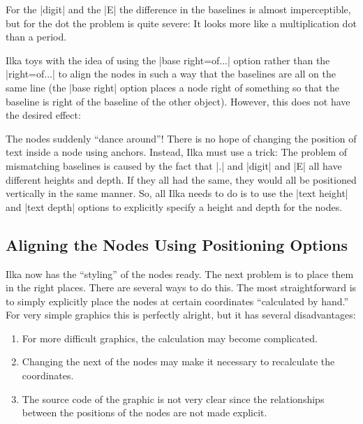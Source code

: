 For the |digit| and the |E| the difference in the baselines is almost
imperceptible, but for the dot the problem is quite severe: It looks
more like a multiplication dot than a period.

Ilka toys with the idea of using the |base right=of...| option rather than
the |right=of...| to align the nodes in such a way that the baselines
are all on the same line (the |base right| option places a node
right of something so that the baseline is right of the baseline of
the other object). However, this does not have the desired effect:
\begin{codeexample}[]
\end{codeexample}
The nodes suddenly ``dance around''! There is no hope of changing the
position of text inside a node using anchors. Instead, Ilka must use a
trick: The problem of mismatching baselines is caused by the fact that
|.| and |digit| and |E| all have different heights and depth. If they
all had the same, they would all be positioned vertically in the same
manner. So, all Ilka needs to do is to use the |text height| and
|text depth| options to explicitly specify a height and depth for the
nodes.
\begin{codeexample}[]
\end{codeexample}



\subsection{Aligning  the Nodes Using Positioning Options}

Ilka now has the ``styling'' of the nodes ready. The next problem is
to place them in the right places. There are several ways to do
this. The most straightforward is to simply explicitly place the nodes
at certain coordinates ``calculated by hand.'' For very simple
graphics this is perfectly alright, but it has several disadvantages:
\begin{enumerate}
\item For more difficult graphics, the calculation may become
  complicated.
\item Changing the next of the nodes may make it necessary to
  recalculate the coordinates.
\item The source code of the graphic is not very clear since the
  relationships between the positions of the nodes are not made
  explicit. 
\end{enumerate}

